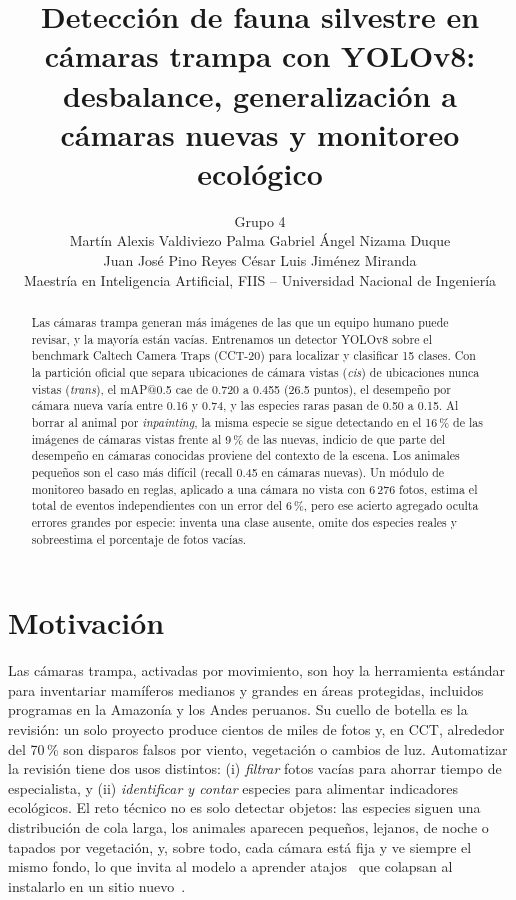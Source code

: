 \documentclass{article}
\title{Detección de fauna silvestre en cámaras trampa con YOLOv8:\\
desbalance, generalización a cámaras nuevas y monitoreo ecológico}
\author{Grupo 4 \\ Martín Alexis Valdiviezo Palma \quad Gabriel Ángel Nizama Duque \\
Juan José Pino Reyes \quad César Luis Jiménez Miranda \\
Maestría en Inteligencia Artificial, FIIS -- Universidad Nacional de Ingeniería}
\begin{document}
\maketitle

\begin{abstract}
Las cámaras trampa generan más imágenes de las que un equipo humano puede revisar, y la mayoría
están vacías. Entrenamos un detector YOLOv8 sobre el benchmark Caltech Camera Traps (CCT-20) para
localizar y clasificar 15 clases. Con la partición
oficial que separa ubicaciones de cámara vistas (\emph{cis}) de ubicaciones nunca vistas (\emph{trans}),
el mAP@0.5 cae de 0.720 a 0.455 (26.5 puntos), el desempeño por cámara nueva varía entre 0.16 y 0.74,
y las especies raras pasan de 0.50 a 0.15. Al borrar al animal por \emph{inpainting}, la misma especie
se sigue detectando en el 16\,\% de las imágenes de cámaras vistas frente al 9\,\% de las nuevas, indicio
de que parte del desempeño en cámaras conocidas proviene del contexto de la escena. Los animales pequeños
son el caso más difícil (recall 0.45 en cámaras nuevas). Un módulo de monitoreo basado en reglas,
aplicado a una cámara no vista con 6\,276 fotos, estima el total de eventos independientes con un error
del 6\,\%, pero ese acierto agregado oculta errores grandes por especie: inventa una clase ausente, omite
dos especies reales y sobreestima el porcentaje de fotos vacías.
\end{abstract}

\section{Motivación}
Las cámaras trampa, activadas por movimiento, son hoy la herramienta estándar para inventariar
mamíferos medianos y grandes en áreas protegidas, incluidos programas en la Amazonía y los Andes
peruanos. Su cuello de botella es la revisión: un solo proyecto produce cientos de miles de fotos y,
en CCT, alrededor del 70\,\% son disparos falsos por viento, vegetación o cambios de luz.
Automatizar la revisión tiene dos usos distintos: (i) \emph{filtrar} fotos vacías para ahorrar
tiempo de especialista, y (ii) \emph{identificar y contar} especies para alimentar indicadores
ecológicos. El reto técnico no es solo detectar objetos: las especies siguen una distribución de
cola larga, los animales aparecen pequeños, lejanos, de noche o tapados por vegetación, y, sobre
todo, cada cámara está fija y ve siempre el mismo fondo, lo que invita al modelo a aprender
atajos~\citep{geirhos2020shortcut} que colapsan al instalarlo en un sitio nuevo~\citep{beery2018recognition}.
\end{document}
